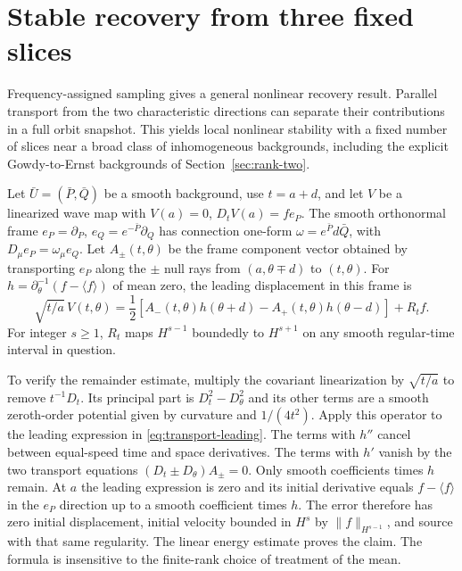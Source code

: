 \section{Stable recovery from three fixed slices}
\label{sec:rank-two-coercivity}
Frequency-assigned sampling gives a general nonlinear recovery
result. Parallel transport from the two characteristic directions
can separate their contributions in a full orbit snapshot.
This yields local nonlinear stability with a fixed number of
slices near a broad class of inhomogeneous backgrounds,
including the explicit Gowdy-to-Ernst backgrounds of
Section~\ref{sec:rank-two}.

Let $\bar U=(\bar P,\bar Q)$ be a smooth background, use
$t=a+d$, and let $V$ be a linearized wave map with
$V(a)=0$, $D_tV(a)=f e_P$. The smooth orthonormal frame
$e_P=\partial_P$, $e_Q=e^{-\bar P}\partial_Q$ has connection
one-form $\omega=e^{\bar P}d\bar Q$, with
$D_\mu e_P=\omega_\mu e_Q$.
Let $A_\pm(t,\theta)$ be the frame component vector obtained
by transporting $e_P$ along the $\pm$ null rays from
$(a,\theta\mp d)$ to $(t,\theta)$.
For $h=\partial_\theta^{-1}(f-\langle f\rangle)$ of mean zero,
the leading displacement in this frame is
\begin{equation}
 \sqrt{t/a}\,V(t,\theta)
  =\frac12\left[A_-(t,\theta)h(\theta+d)
                    -A_+(t,\theta)h(\theta-d)\right]+R_t f .
 \label{eq:transport-leading}
\end{equation}
For integer $s\ge1$, $R_t$ maps $H^{s-1}$ boundedly to
$H^{s+1}$ on any smooth regular-time interval in question.

To verify the remainder estimate, multiply the covariant
linearization by $\sqrt{t/a}$ to remove $t^{-1}D_t$.
Its principal part is $D_t^2-D_\theta^2$ and its other
terms are a smooth zeroth-order potential given by curvature
and $1/(4t^2)$. Apply this operator to the leading expression
in \eqref{eq:transport-leading}. The terms with $h''$
cancel between equal-speed time and space derivatives.
The terms with $h'$ vanish by the two transport equations
$(D_t\pm D_\theta)A_\pm=0$.
Only smooth coefficients times $h$ remain.
At $a$ the leading expression is zero and its initial
derivative equals $f-\langle f\rangle$ in the $e_P$ direction
up to a smooth coefficient times $h$.
The error therefore has zero initial displacement, initial
velocity bounded in $H^s$ by $\|f\|_{H^{s-1}}$, and source
with that same regularity. The linear energy estimate proves
the claim. The formula is insensitive to the finite-rank
choice of treatment of the mean.


